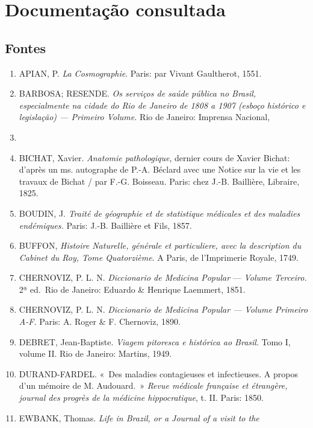 \chapter{Documentação consultada}\label{documentauxe7uxe3o-consultada}

\section*{Fontes}\label{fontes}

\begin{enumerate}
\def\labelenumi{\arabic{enumi}.}
\item
  APIAN, P. \textit{La Cosmographie}. Paris: par Vivant Gaultherot, 1551.
\item
  BARBOSA; RESENDE. \textit{Os serviços de saúde pública no Brasil,
  especialmente na cidade do Rio de Janeiro de 1808 a 1907 (esboço
  histórico e legislação) --- Primeiro Volume.} Rio de Janeiro: Imprensa
  Nacional,
\item
\item
  BICHAT, Xavier. \textit{Anatomie pathologique}, dernier cours de Xavier
  Bichat: d'après un ms. autographe de P.-A. Béclard avec une Notice sur
  la vie et les travaux de Bichat / par F.-G. Boisseau. Paris: chez
  J.-B. Baillière, Libraire, 1825.
\item
  BOUDIN, J. \textit{Traité de géographie et de statistique médicales et
  des maladies endémiques.} Paris: J.-B. Baillière et Fils, 1857.
\item
  BUFFON, \textit{Histoire Naturelle, générale et particuliere, avec la
  description du Cabinet du Roy, Tome Quatorzième}. A Paris, de
  l'Imprimerie Royale, 1749.
\item
  CHERNOVIZ, P. L. N. \textit{Diccionario de Medicina Popular} ---
  \textit{Volume Terceiro.} 2ª ed.~Rio de Janeiro: Eduardo \& Henrique
  Laemmert, 1851.
\item
  CHERNOVIZ, P. L. N. \textit{Diccionario de Medicina Popular --- Volume
  Primeiro A-F.} Paris: A. Roger \& F. Chernoviz, 1890.
\item
  DEBRET, Jean-Baptiste. \textit{Viagem pitoresca e histórica ao Brasil}.
  Tomo I, volume II. Rio de Janeiro: Martins, 1949.
\item
  DURAND-FARDEL. «~Des maladies contagieuses et infectieuses. A propos
  d'un mémoire de M. Audouard.~» \textit{Revue médicale française et
  étrangère, journal des progrès de la médicine hippocratique}, t. II.
  Paris: 1850.
\item
  EWBANK, Thomas. \textit{Life in Brazil, or a Journal of a visit to the
}
\end{enumerate}
